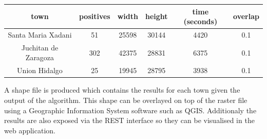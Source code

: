 \begin{center}
  \begin{tabular}{|c|c|c|c|c|c|}
    \hline
    town & positives & width & height & time (seconds) & overlap\\ \hline
    Santa Maria Xadani &51 & 25598 & 30144 & 4420 & 0.1 \\ \hline
    Juchitan de Zaragoza &302 & 42375 & 28831 & 6375 & 0.1 \\ \hline
    Union Hidalgo &25 & 19945 & 28795 & 3938 & 0.1\\
    \hline
  \end{tabular}
\end{center}

A shape file is produced which contains the results for each town given the output of the algorithm. This shape can be overlayed on top of the raster file using a Geographic Information System software such as QGIS. Additionaly the results are also exposed via the REST interface so they can be visualised in the web application.



